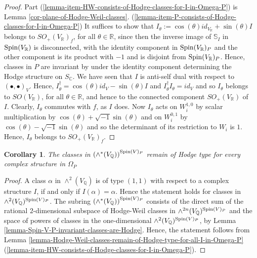 \documentclass[12pt]{amsart}
\numberwithin{equation}{subsection}
\theoremstyle{plain}
\newtheorem{cor}[thm]{Corollary}
\theoremstyle{definition}
\newcommand{\CC}{{\mathbb C}}
\newcommand{\QQ}{{\mathbb Q}}
\newcommand{\RR}{{\mathbb R}}
\newcommand{\Spin}{{\rm Spin}}
\begin{document}
\begin{proof}
Part (\ref{lemma-item-HW-consists-of-Hodge-classes-for-I-in-Omega-P})
is Lemma \ref{cor-plane-of-Hodge-Weil-classes}.
(\ref{lemma-item-P-consists-of-Hodge-classes-for-I-in-Omega-P})
It suffices to show that $I_\theta:=\cos(\theta)id_{V_\RR}+\sin(\theta)I$ belongs to  $SO_+(V_\RR)_f$, for all $\theta\in\RR$, since then 
the inverse image of ${\mathbb S}_I$
in $\Spin(V_\RR)$ is disconnected, with the identity component in $\Spin(V_\RR)_P$ and the other component is its product with $-1$ and is disjoint from $\Spin(V_\RR)_P$. 
Hence, classes in $P$ are invariant by under the identity component determining the Hodge structure on $S_\CC$. We have seen that $I$ is anti-self dual with respect to $(\bullet,\bullet)_V$. Hence, $I_\theta^\dagger=\cos(\theta)id_V-\sin(\theta)I$ and
$I_\theta^\dagger I_\theta=id_V$ and so $I_\theta$ belongs to $SO(V_\RR)$, for all $\theta\in\RR$, and hence to the connected component $SO_+(V_\RR)$ of $I$. Clearly, $I_\theta$ commutes with $f$, as $I$ does. 
Now $I_\theta$ acts on $W_i^{1,0}$ by scalar multiplication by $\cos(\theta)+\sqrt{-1}\sin(\theta)$ and on $W_i^{0,1}$ by $\cos(\theta)-\sqrt{-1}\sin(\theta)$
and so the determinant of its restriction to $W_i$ is $1$. Hence, $I_\theta$ belongs to $SO_+(V_\RR)_f$.
\end{proof}

\begin{cor}
\label{corollary-Spin-V-P-invariant-classes-are-Hodge}
The classes in $\left(\wedge^*(V_\QQ)\right)^{\Spin(V)_P}$ remain of Hodge type for every complex structure in $\Omega_P$
\end{cor}

\begin{proof}
A class $\alpha$ in $\wedge^2(V_\QQ)$ is of type $(1,1)$ with respect to a complex structure $I$, if and only if $I(\alpha)=\alpha$.
Hence the statement holds for classes in $\wedge^2(V_\QQ)^{\Spin(V)_P}$. The subring $\left(\wedge^*(V_\QQ)\right)^{\Spin(V)_P}$ 
consists of the direct sum of the rational $2$-dimensional subspace of Hodge-Weil classes in $\wedge^{2n}(V_\QQ)^{\Spin(V)_P}$ and
the space of powers of  classes in the one-dimensional $\wedge^2(V_\QQ)^{\Spin(V)_P}$, by Lemma \ref{lemma-Spin-V-P-invariant-classes-are-Hodge}. 
Hence, the statement follows from Lemma \ref{lemma-Hodge-Weil-classes-remain-of-Hodge-type-for-all-I-in-Omega-P}(\ref{lemma-item-HW-consists-of-Hodge-classes-for-I-in-Omega-P}).
\end{proof}
\end{document}
